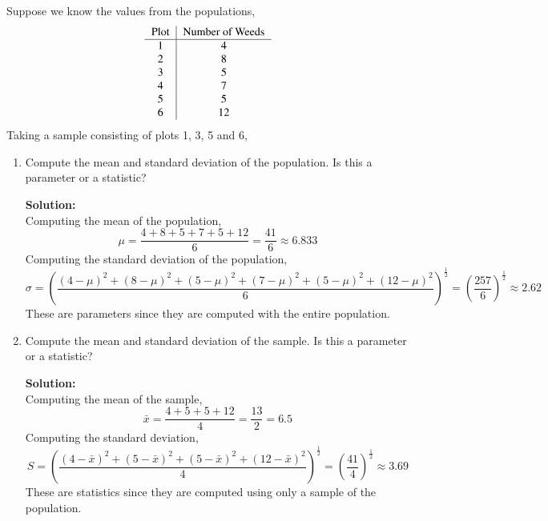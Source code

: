 \documentclass[12pt]{article}
\makeatletter
\theoremstyle{homework}
\newenvironment{exercise}[1]
{\def\@currentlabel{#1}\exercisecore}
{\endexercisecore}
\newcommand{\localhead}[1]{\par\smallskip\noindent\textbf{#1}\nobreak\\}%
\newcommand\solution{\localhead{Solution:}}
\makeatother
\begin{document}
\begin{exercise}{1} Suppose we know the values from the populations, 
    \begin{equation*}
    \begin{tabular}{c|c}
        Plot & Number of Weeds \\
        \hline
        1&4\\
        2&8\\
        3&5\\
        4&7\\
        5&5\\
        6&12
    \end{tabular}
\end{equation*}
Taking a sample consisting of plots 1, 3, 5 and 6,
\begin{enumerate}
    \item Compute the mean and standard deviation of the population. 
    Is this a parameter or a statistic?
    \solution Computing the mean of the population,
    \begin{equation*}
        \mu = \dfrac{4 + 8 + 5 + 7 + 5 + 12}{6} = \dfrac{41}{6}\approx 6.833
    \end{equation*}
    Computing the standard deviation of the population,
    \begin{equation*}
        \sigma =\left(\dfrac{(4 - \mu)^2+(8 - \mu)^2+(5 - \mu)^2+(7 - \mu)^2+(5 - \mu)^2+(12 - \mu)^2}{6}\right)^{\frac{1}{2}} = \left(\frac{257}{6}\right)^{\frac{1}{2}} \approx 2.62
    \end{equation*}
    These are parameters since they are computed with the entire population.
    \item Compute the mean and standard deviation of the sample. Is this a 
    parameter or a statistic?
    \solution Computing the mean of the sample,
    \begin{equation*}
        \bar{x} = \dfrac{4 + 5 + 5 + 12}{4} = \frac{13}{2} = 6.5
    \end{equation*}
    Computing the standard deviation,
    \begin{equation*}
        S =\left(\dfrac{(4 - \bar{x})^2+(5 - \bar{x})^2+(5 - \bar{x})^2+(12 - \bar{x})^2}{4}\right)^{\frac{1}{2}} = \left(\frac{41}{4}\right)^{\frac{1}{2}} \approx 3.69
    \end{equation*}
    These are statistics since they are computed using only a sample of the population. 
\end{enumerate}
\end{exercise}
\vspace{1in}
\end{document}
